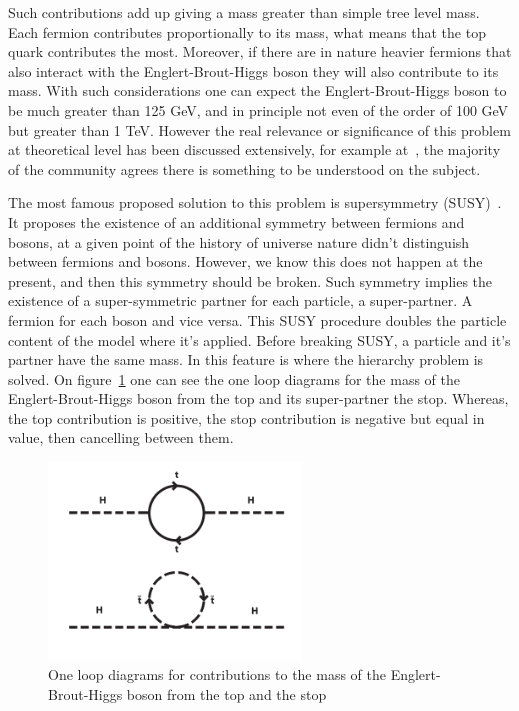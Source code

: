 Such contributions add up giving a mass greater than simple tree level mass. Each fermion contributes proportionally to its mass, what means that the top quark contributes the most. Moreover, if there are in nature heavier fermions that also interact with the Englert-Brout-Higgs boson they will also contribute to its mass. With such considerations one can expect the Englert-Brout-Higgs boson to be much greater than 125 GeV, and in principle not even of the order of 100 GeV but greater than 1 TeV. However the real relevance or significance of this problem at theoretical level has been discussed extensively, for example at~\cite{Jegerlehner:2013nna}, the majority of the community agrees there is something to be understood on the subject. 

The most famous proposed solution to this problem is supersymmetry (SUSY)~\cite{Martin:1997ns}. It proposes the existence of an additional symmetry between fermions and bosons, at a given point of the history of universe nature didn't distinguish between fermions and bosons. However, we know this does not happen at the present, and then this symmetry should be broken. Such symmetry implies the existence of a super-symmetric partner for each particle, a super-partner. A fermion for each boson and vice versa. This SUSY procedure doubles the particle content of the model where it's applied. Before breaking SUSY, a particle and it's partner have the same mass. In this feature is where the hierarchy problem is solved. On figure~\ref{fig:susy} one can see the one loop diagrams for the mass of the Englert-Brout-Higgs boson from the top and its super-partner the stop. Whereas, the top contribution is positive, the stop contribution is negative but equal in value, then cancelling between them.

\begin{figure}[!Hhtbp]
  \begin{center}
    \includegraphics[width=0.6\textwidth]{figs/SUSY.png}
    \caption{One loop diagrams for contributions to the mass of the Englert-Brout-Higgs boson from the top and the stop}
    \label{fig:susy}
  \end{center}
\end{figure}

